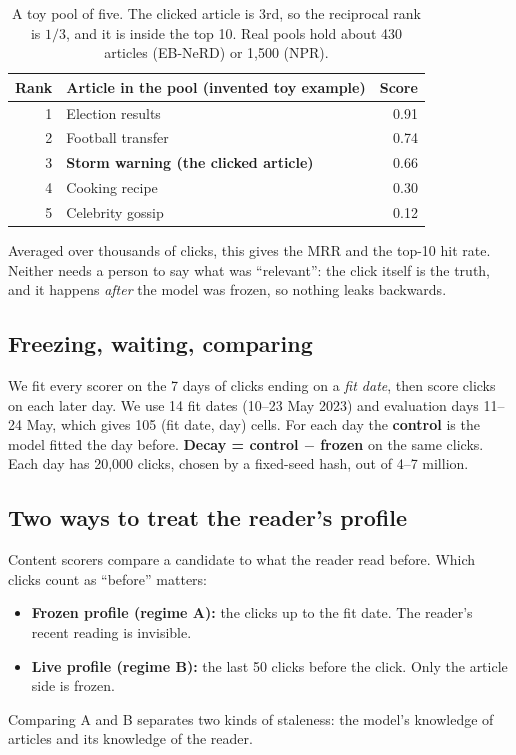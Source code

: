 \documentclass[11pt,a4paper]{article}
\newcommand{\term}[1]{\textbf{#1}}
\begin{document}
\begin{table}[H]
\centering\small
\begin{tabular}{@{}rlr@{}}
\toprule
Rank & Article in the pool (invented toy example) & Score\\
\midrule
1 & Election results & 0.91\\
2 & Football transfer & 0.74\\
\rowcolor{green!15} 3 & \textbf{Storm warning (the clicked article)} & 0.66\\
4 & Cooking recipe & 0.30\\
5 & Celebrity gossip & 0.12\\
\bottomrule
\end{tabular}
\caption{A toy pool of five. The clicked article is 3rd, so the reciprocal rank is $1/3$, and it is inside the top 10. Real pools hold about 430 articles (EB-NeRD) or 1,500 (NPR).}
\end{table}
Averaged over thousands of clicks, this gives the MRR and the top-10 hit rate. Neither needs a person to say what was ``relevant'': the click itself is the truth, and it happens \emph{after} the model was frozen, so nothing leaks backwards.

\subsection{Freezing, waiting, comparing}
We fit every scorer on the 7 days of clicks ending on a \emph{fit date}, then score clicks on each later day. We use 14 fit dates (10--23 May 2023) and evaluation days 11--24 May, which gives 105 (fit date, day) cells. For each day the \term{control} is the model fitted the day before. \textbf{Decay = control $-$ frozen} on the same clicks. Each day has 20,000 clicks, chosen by a fixed-seed hash, out of 4--7 million.

\subsection{Two ways to treat the reader's profile}
Content scorers compare a candidate to what the reader read before. Which clicks count as ``before'' matters:
\begin{itemize}
\item \term{Frozen profile (regime A):} the clicks up to the fit date. The reader's recent reading is invisible.
\item \term{Live profile (regime B):} the last 50 clicks before the click. Only the article side is frozen.
\end{itemize}
Comparing A and B separates two kinds of staleness: the model's knowledge of articles and its knowledge of the reader.
\end{document}
